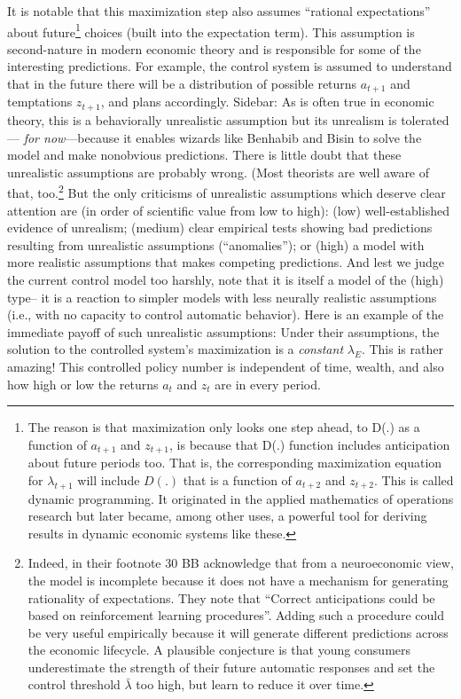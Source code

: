 \documentclass{article}
\begin{document}
It is notable that this maximization step also assumes “rational expectations” about future\footnote{The reason is that maximization only looks one step ahead, to D(.) as a function of $a_{t+1}$ and $z_{t+1}$, is because that D(.) function includes anticipation about future periods too. That is, the corresponding maximization equation for $\lambda_{t+1}$ will include $D(.)$ that is a function of $a_{t+2}$ and $z_{t+2}$. This is called dynamic programming. It originated in the applied mathematics of operations research but later became, among other uses, a powerful tool for deriving results in dynamic economic systems like these.} choices (built into the expectation term). This assumption is second-nature in modern economic theory and is responsible for some of the interesting predictions. For example, the control system is assumed to understand that in the future there will be a distribution of possible returns $a_{t+1}$ and temptations $z_{t+1}$, and plans accordingly. 
Sidebar: As is often true in economic theory, this is a behaviorally unrealistic assumption but its unrealism is tolerated— \emph{for now}—because it enables wizards like Benhabib and Bisin to solve the model and make nonobvious predictions. There is little doubt that these unrealistic assumptions are probably wrong. (Most theorists are well aware of that, too.\footnote{Indeed, in their footnote 30 BB acknowledge that from a neuroeconomic view, the model is incomplete because it does not have a mechanism for generating rationality of expectations. They note that “Correct anticipations could be based on reinforcement learning procedures”. Adding such a procedure could be very useful empirically because it will generate different predictions across the economic lifecycle. A plausible conjecture is that young consumers underestimate the strength of their future automatic responses and set the control threshold $\bar{\lambda}$ too high, but learn to reduce it over time.} But the only criticisms of unrealistic assumptions which deserve clear attention are (in order of scientific value from low to high):  (low) well-established evidence of unrealism; (medium) clear empirical tests showing bad predictions resulting from unrealistic assumptions (“anomalies”); or (high) a model with more realistic assumptions that makes competing predictions. And lest we judge the current control model too harshly, note that it is itself a model of the (high) type-- it is a reaction to simpler models with less neurally realistic assumptions (i.e., with no capacity to control automatic behavior). 
Here is an example of the immediate payoff of such unrealistic assumptions: Under their assumptions, the solution to the controlled system’s maximization is a \emph{constant} $\lambda_E$. This is rather amazing! This controlled policy number is independent of time, wealth, and also how high or low the returns $a_t$ and $z_t$ are in every period. 
\end{document}
